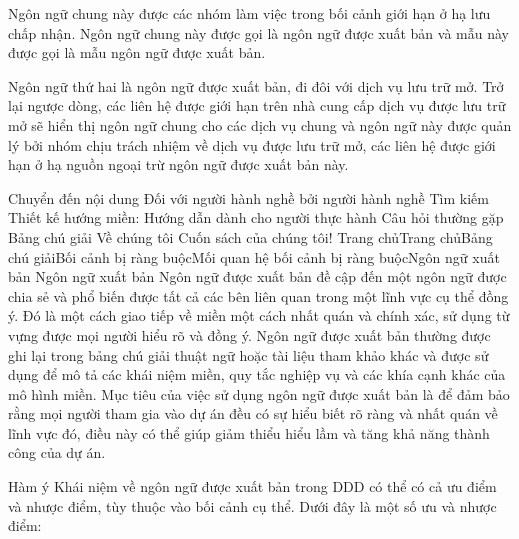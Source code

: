 
Ngôn ngữ chung này được các nhóm làm việc trong bối cảnh giới hạn ở hạ lưu chấp nhận. Ngôn ngữ chung này được gọi là ngôn ngữ được xuất bản và mẫu này được gọi là mẫu ngôn ngữ được xuất bản.


Ngôn ngữ thứ hai là ngôn ngữ được xuất bản, đi đôi với dịch vụ lưu trữ mở. Trở lại ngược dòng, các liên hệ được giới hạn trên nhà cung cấp dịch vụ được lưu trữ mở sẽ hiển thị ngôn ngữ chung cho các dịch vụ chung và ngôn ngữ này được quản lý bởi nhóm chịu trách nhiệm về dịch vụ được lưu trữ mở, các liên hệ được giới hạn ở hạ nguồn ngoại trừ ngôn ngữ được xuất bản này.



Chuyển đến nội dung
Đối với người hành nghề bởi người hành nghề
Tìm kiếm
Thiết kế hướng miền: Hướng dẫn dành cho người thực hành
Câu hỏi thường gặp
Bảng chú giải
Về chúng tôi
Cuốn sách của chúng tôi!
Trang chủTrang chủBảng chú giảiBối cảnh bị ràng buộcMối quan hệ bối cảnh bị ràng buộcNgôn ngữ xuất bản
Ngôn ngữ xuất bản
Ngôn ngữ được xuất bản đề cập đến một ngôn ngữ được chia sẻ và phổ biến được tất cả các bên liên quan trong một lĩnh vực cụ thể đồng ý. Đó là một cách giao tiếp về miền một cách nhất quán và chính xác, sử dụng từ vựng được mọi người hiểu rõ và đồng ý. Ngôn ngữ được xuất bản thường được ghi lại trong bảng chú giải thuật ngữ hoặc tài liệu tham khảo khác và được sử dụng để mô tả các khái niệm miền, quy tắc nghiệp vụ và các khía cạnh khác của mô hình miền. Mục tiêu của việc sử dụng ngôn ngữ được xuất bản là để đảm bảo rằng mọi người tham gia vào dự án đều có sự hiểu biết rõ ràng và nhất quán về lĩnh vực đó, điều này có thể giúp giảm thiểu hiểu lầm và tăng khả năng thành công của dự án.

Hàm ý
Khái niệm về ngôn ngữ được xuất bản trong DDD có thể có cả ưu điểm và nhược điểm, tùy thuộc vào bối cảnh cụ thể. Dưới đây là một số ưu và nhược điểm:

